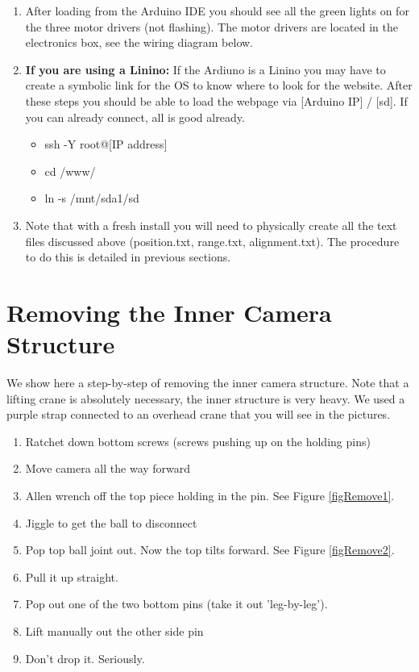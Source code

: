 \documentclass[11pt]{article}
\begin{document}
\begin{enumerate}
\item After loading from the Arduino IDE you should see all the green lights on for the three motor drivers (not flashing).  
The motor drivers are located in the electronics box, see the wiring diagram below.

\item {\textbf{If you are using a Linino:}}  If the Ardiuno is a Linino you may have to create a symbolic link for the OS to know where to look for the website.  
After these steps you should be able to load the webpage via [Arduino IP] / [sd].  
If you can already connect, all is good already.
	\begin{itemize}
		\item ssh -Y root@[IP address]
		\item cd /www/
		\item ln -s /mnt/sda1/sd
	\end{itemize}
	
\item Note that with a fresh install you will need to physically create all the text files discussed above (position.txt, range.txt, alignment.txt).
	The procedure to do this is detailed in previous sections.
\end{enumerate}


\section{Removing the Inner Camera Structure}
We show here a step-by-step of removing the inner camera structure.  
Note that a lifting crane is absolutely necessary, the inner structure is very heavy.
We used a purple strap connected to an overhead crane that you will see in the pictures.

\begin{enumerate}
\item Ratchet down bottom screws (screws pushing up on the holding pins)
\item Move camera all the way forward
\item Allen wrench off the top piece holding in the pin.  See Figure \ref{figRemove1}.
\item Jiggle to get the ball to disconnect
\item Pop top ball joint out.  Now the top tilts forward.  See Figure \ref{figRemove2}.
\item Pull it up straight.
\item Pop out one of the two bottom pins (take it out 'leg-by-leg'). 
\item Lift manually out the other side pin
\item Don't drop it.  Seriously.
\end{enumerate}
\end{document}

